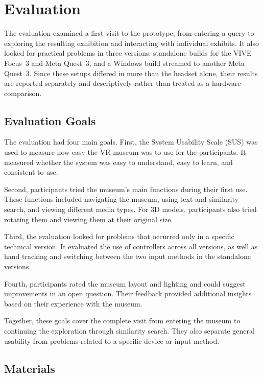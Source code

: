\chapter{Evaluation}
\label{ch:evaluation}

\begingroup
\setaftersecskip{6pt}
\setlength{\emergencystretch}{2em}
The evaluation examined a first visit to the prototype, from entering a query to exploring the resulting exhibition and interacting with individual exhibits. It also looked for practical problems in three versions: standalone builds for the VIVE Focus~3 and Meta Quest~3, and a Windows build streamed to another Meta Quest~3. Since these setups differed in more than the headset alone, their results are reported separately and descriptively rather than treated as a hardware comparison.

\section{Evaluation Goals}

The evaluation had four main goals. First, the System Usability Scale (SUS) was used to measure how easy the VR museum was to use for the participants. It measured whether the system was easy to understand, easy to learn, and consistent to use.

Second, participants tried the museum's main functions during their first use. These functions included navigating the museum, using text and similarity search, and viewing different media types. For 3D models, participants also tried rotating them and viewing them at their original size.

Third, the evaluation looked for problems that occurred only in a specific technical version. It evaluated the use of controllers across all versions, as well as hand tracking and switching between the two input methods in the standalone versions.

Fourth, participants rated the museum layout and lighting and could suggest improvements in an open question. Their feedback provided additional insights based on their experience with the museum.

Together, these goals cover the complete visit from entering the museum to continuing the exploration through similarity search. They also separate general usability from problems related to a specific device or input method.


\section{Materials}

